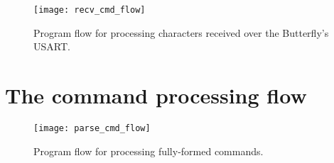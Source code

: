 \begin{figure}[ht]
    \begin{center}
        \texttt{[image: recv\_cmd\_flow]}
        \caption{Program flow for processing characters received over the Butterfly's USART.\label{fig:recflow}}
    \end{center}
\end{figure}



\clearpage{}
\section{The command processing flow}

\begin{figure}[ht]
    \begin{center}
        \texttt{[image: parse\_cmd\_flow]}
        \caption{Program flow for processing fully-formed commands.\label{fig:cmdflow}}
    \end{center}
\end{figure}






